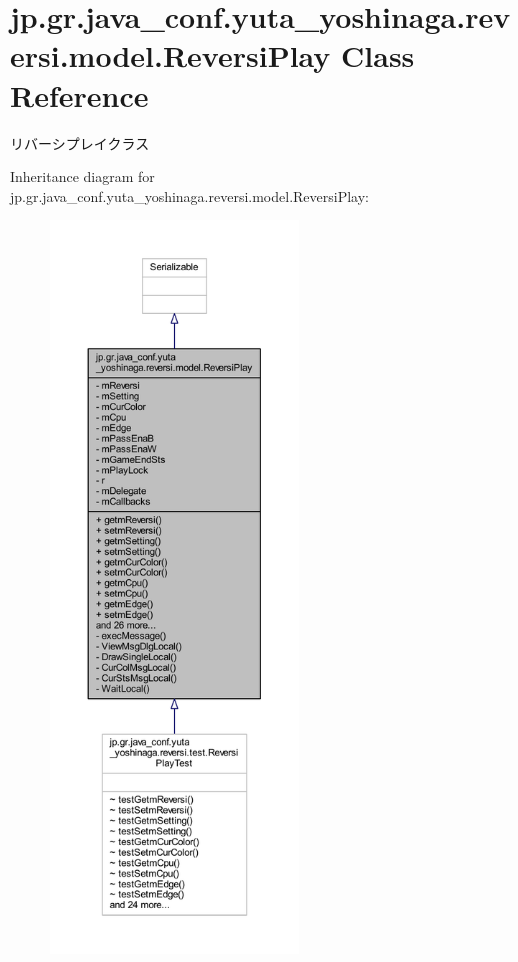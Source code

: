 \hypertarget{classjp_1_1gr_1_1java__conf_1_1yuta__yoshinaga_1_1reversi_1_1model_1_1_reversi_play}{}\section{jp.\+gr.\+java\+\_\+conf.\+yuta\+\_\+yoshinaga.\+reversi.\+model.\+Reversi\+Play Class Reference}
\label{classjp_1_1gr_1_1java__conf_1_1yuta__yoshinaga_1_1reversi_1_1model_1_1_reversi_play}


リバーシプレイクラス  




Inheritance diagram for jp.\+gr.\+java\+\_\+conf.\+yuta\+\_\+yoshinaga.\+reversi.\+model.\+Reversi\+Play\+:
\nopagebreak
\begin{figure}[H]
\begin{center}
\leavevmode
\includegraphics[height=550pt]{classjp_1_1gr_1_1java__conf_1_1yuta__yoshinaga_1_1reversi_1_1model_1_1_reversi_play__inherit__graph}
\end{center}
\end{figure}


